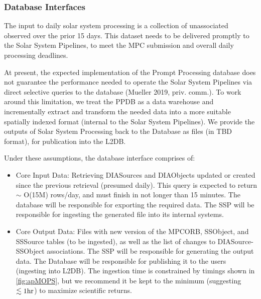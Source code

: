 
\subsubsection{Database Interfaces}

The input to daily solar system processing is a collection of unassociated \DIASources observed over the prior 15 days. This dataset needs to be delivered promptly to the Solar System Pipelines, to meet the MPC submission and overall daily processing deadlines.

At present, the expected implementation of the Prompt Processing database does not guarantee the performance needed to operate the Solar System Pipelines via direct selective queries to the database (Mueller 2019, priv. comm.). To work around this limitation, we treat the PPDB as a data warehouse and incrementally extract and transform the needed data into a more suitable spatially indexed format (internal to the Solar System Pipelines). We provide the outputs of Solar System Processing back to the Database as files (in TBD format), for publication into the L2DB.

Under these assumptions, the database interface comprises of:
\begin{itemize}
	\item Core Input Data: Retrieving DIASources and DIAObjects updated or created since the previous retrieval (presumed daily). This query is expected to return $\sim$ O(15M) rows/day, and must finish in not longer than 15 minutes. The database will be responsible for exporting the required data. The SSP will be responsible for ingesting the generated file into its internal systems.

	\item Core Output Data: Files with new version of the MPCORB, SSObject, and SSSource tables (to be ingested), as well as the list of changes to DIASource-SSObject associations. The SSP will be responsible for generating the output data. The Database will be responsible for publishing it to the users (ingesting into L2DB). The ingestion time is constrained by timings shown in \ref{fig:apMOPS}, but we recommend it be kept to the minimum (suggesting $\lesssim 1{\rm hr}$) to maximize scientific returns.
\end{itemize}

